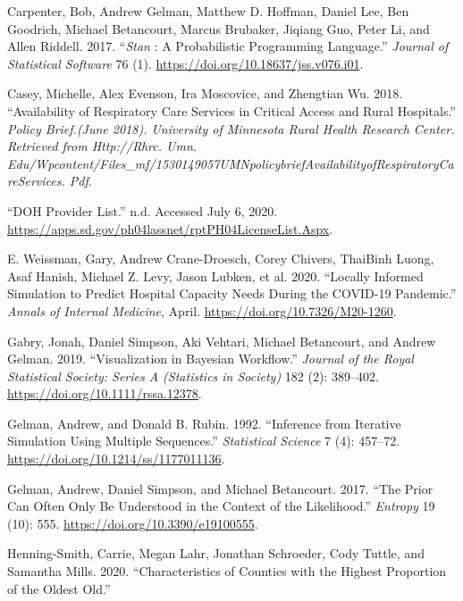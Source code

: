 \documentclass[
]{article}
\begin{document}
\leavevmode\hypertarget{ref-carpenter_stan_2017}{}%
Carpenter, Bob, Andrew Gelman, Matthew D. Hoffman, Daniel Lee, Ben Goodrich, Michael Betancourt, Marcus Brubaker, Jiqiang Guo, Peter Li, and Allen Riddell. 2017. ``\emph{Stan} : A Probabilistic Programming Language.'' \emph{Journal of Statistical Software} 76 (1). \url{https://doi.org/10.18637/jss.v076.i01}.

\leavevmode\hypertarget{ref-casey_availability_2018}{}%
Casey, Michelle, Alex Evenson, Ira Moscovice, and Zhengtian Wu. 2018. ``Availability of Respiratory Care Services in Critical Access and Rural Hospitals.'' \emph{Policy Brief.(June 2018). University of Minnesota Rural Health Research Center. Retrieved from Http://Rhrc. Umn. Edu/Wpcontent/Files\_mf/1530149057UMNpolicybriefAvailabilityofRespiratoryCareServices. Pdf}.

\leavevmode\hypertarget{ref-noauthor_doh_nodate}{}%
``DOH Provider List.'' n.d. Accessed July 6, 2020. \url{https://apps.sd.gov/ph04lassnet/rptPH04LicenseList.Aspx}.

\leavevmode\hypertarget{ref-e_weissman_locally_2020}{}%
E. Weissman, Gary, Andrew Crane-Droesch, Corey Chivers, ThaiBinh Luong, Asaf Hanish, Michael Z. Levy, Jason Lubken, et al. 2020. ``Locally Informed Simulation to Predict Hospital Capacity Needs During the COVID-19 Pandemic.'' \emph{Annals of Internal Medicine}, April. \url{https://doi.org/10.7326/M20-1260}.

\leavevmode\hypertarget{ref-gabry_visualization_2019}{}%
Gabry, Jonah, Daniel Simpson, Aki Vehtari, Michael Betancourt, and Andrew Gelman. 2019. ``Visualization in Bayesian Workflow.'' \emph{Journal of the Royal Statistical Society: Series A (Statistics in Society)} 182 (2): 389--402. \url{https://doi.org/10.1111/rssa.12378}.

\leavevmode\hypertarget{ref-gelman_inference_1992}{}%
Gelman, Andrew, and Donald B. Rubin. 1992. ``Inference from Iterative Simulation Using Multiple Sequences.'' \emph{Statistical Science} 7 (4): 457--72. \url{https://doi.org/10.1214/ss/1177011136}.

\leavevmode\hypertarget{ref-gelman_prior_2017}{}%
Gelman, Andrew, Daniel Simpson, and Michael Betancourt. 2017. ``The Prior Can Often Only Be Understood in the Context of the Likelihood.'' \emph{Entropy} 19 (10): 555. \url{https://doi.org/10.3390/e19100555}.

\leavevmode\hypertarget{ref-henning-smith_characteristics_2020}{}%
Henning-Smith, Carrie, Megan Lahr, Jonathan Schroeder, Cody Tuttle, and Samantha Mills. 2020. ``Characteristics of Counties with the Highest Proportion of the Oldest Old.''
\end{document}
